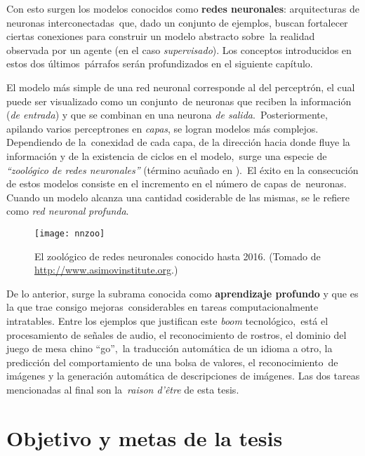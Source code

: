 Con esto surgen los modelos conocidos como \textbf{redes neuronales}: arquitecturas de neuronas interconectadas\
que, dado un conjunto de ejemplos, buscan fortalecer ciertas conexiones para construir un modelo abstracto sobre\
la realidad observada por un agente (en el caso \emph{supervisado}). Los conceptos introducidos en estos dos últimos\
párrafos serán profundizados en el siguiente capítulo.\par
El modelo más simple de una red neuronal corresponde al del perceptrón, el cual puede ser visualizado como un conjunto\
de neuronas que reciben la información (\emph{de entrada}) y que se combinan en una neurona \emph{de salida}.\
Posteriormente, apilando varios perceptrones en \emph{capas}, se logran modelos más complejos. Dependiendo de la\
conexidad de cada capa, de la dirección hacia donde fluye la información y de la existencia de ciclos en el modelo,\
surge una especie de \emph{``zoológico de redes neuronales''} (término acuñado en \cite{website:theasimovinstitute}).\
El éxito en la consecución de estos modelos consiste en el incremento en el número de capas de\
neuronas. Cuando un modelo alcanza una cantidad cosiderable de las mismas, se le refiere como \emph{red neuronal}
\emph{profunda}.

\begin{figure}[H]
  \centering
  \texttt{[image: nnzoo]}
  \caption{El zoológico de redes neuronales conocido hasta 2016.
    (Tomado de \url{http://www.asimovinstitute.org}.)
    \cite{website:theasimovinstitute}
  }
\end{figure}

De lo anterior, surge la subrama conocida como \textbf{aprendizaje profundo} y que es la que trae consigo mejoras\
considerables en tareas computacionalmente intratables. Entre los ejemplos que justifican este \emph{boom} tecnológico,\
está el procesamiento de señales de audio, el reconocimiento de rostros, el dominio del juego de mesa chino ``go'',\
la traducción automática de un idioma a otro, la predicción del comportamiento de una bolsa de valores, el reconocimiento\
de imágenes y la generación automática de descripciones de imágenes. Las dos tareas mencionadas al final son la\
\emph{raison d'être} de esta tesis.

\section{Objetivo y metas de la tesis}


